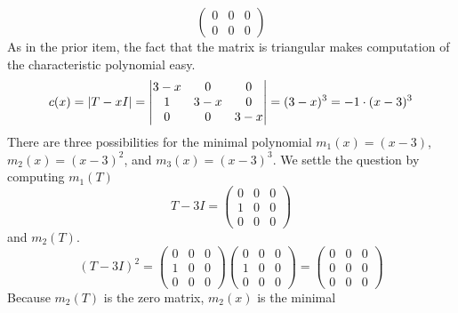 \begin{exercises}
\begin{answer}
\begin{exparts}
\begin{equation*}
\begin{pmatrix}
             0  &0  &0  \\
             0  &0  &0
           \end{pmatrix}
         \end{equation*}
       \partsitem As in the prior item, the fact that the matrix is 
        triangular makes computation of the characteristic polynomial
        easy.
        \begin{equation*}
          c(x)=\deter{T-xI}
              =
              \begin{vmatrix}
                3-x  &0   &0   \\
                1    &3-x &0   \\
                0    &0   &3-x
              \end{vmatrix}
              =(3-x)^3=-1\cdot (x-3)^3
        \end{equation*}
        There are three possibilities for the minimal polynomial
        $m_1(x)=(x-3)$, $m_2(x)=(x-3)^2$, and $m_3(x)=(x-3)^3$.
        We settle the question by computing $m_1(T)$
        \begin{equation*}
          T-3I=
          \begin{pmatrix}
            0  &0  &0  \\
            1  &0  &0  \\
            0  &0  &0
          \end{pmatrix}
        \end{equation*}
        and $m_2(T)$.
        \begin{equation*}
          (T-3I)^2=
          \begin{pmatrix}
            0  &0  &0  \\
            1  &0  &0  \\
            0  &0  &0
          \end{pmatrix}
          \begin{pmatrix}
            0  &0  &0  \\
            1  &0  &0  \\
            0  &0  &0
          \end{pmatrix}
          =          
          \begin{pmatrix}
            0  &0  &0  \\
            0  &0  &0  \\
            0  &0  &0
          \end{pmatrix}
        \end{equation*}
        Because $m_2(T)$ is the zero matrix, $m_2(x)$ is the minimal

\end{exparts}
\end{answer}
\end{exercises}
